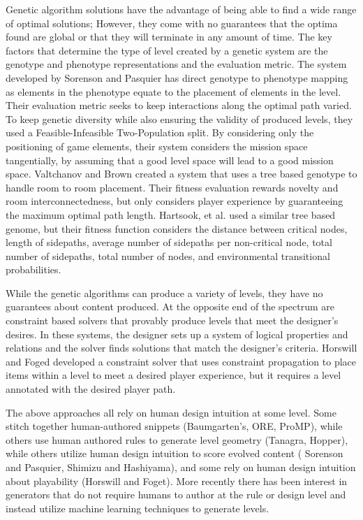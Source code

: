 \documentclass[a4paper]{article}
\begin{document}
Genetic algorithm solutions have the advantage of being able to find a wide range of optimal solutions; However, they come with no guarantees that the optima found are global or that they will terminate in any amount of time.  The key factors that determine the type of level created by a genetic system are the genotype and phenotype representations and the evaluation metric. The system developed by Sorenson and Pasquier \cite{SORPASLEVEL} has direct genotype to phenotype mapping as elements in the phenotype equate to the placement of elements in the level. Their evaluation metric seeks to keep interactions along the optimal path varied.  To keep genetic diversity while also ensuring the validity of produced levels, they used a Feasible-Infeasible Two-Population split.  By considering only the positioning of game elements, their system considers the mission space tangentially, by assuming that a good level space will lead to a good mission space. Valtchanov and Brown \cite{VALTCHANOVEVOLVE} 
created a system that uses a tree based genotype to handle room to room placement.  Their fitness evaluation rewards novelty and room interconnectedness, but only considers player experience by guaranteeing the maximum optimal path length.  Hartsook, et al. \cite{hartsook} used a similar tree based genome, but their fitness function considers the distance between critical nodes, 
length of sidepaths, average number of sidepaths per non-critical node, total 
number of sidepaths, total number of nodes, and environmental transitional probabilities.  

While the genetic algorithms can produce a variety of levels, they have no guarantees about content produced. At the opposite end of the spectrum are constraint based solvers that provably produce levels that meet the designer's desires. In these systems, the designer sets up a system of logical properties and relations and the solver finds solutions that match the designer's criteria.
Horswill and Foged \cite{HORSWILLCONSTRAINT} developed a constraint solver that uses constraint propagation to place items within a level to meet a desired player experience, but it requires a level annotated with the desired player path. 

The above approaches all rely on human design intuition at some level.  Some stitch together human-authored snippets (Baumgarten's, ORE, ProMP), while others use human authored rules to generate level geometry (Tanagra, Hopper), while others  utilize human design intuition to score evolved content ( Sorenson and Pasquier, Shimizu and Hashiyama), and some rely on human design intuition about playability (Horswill and Foget).  More recently there has been interest in generators that do not require humans to author at the rule or design level and instead utilize machine learning techniques to generate levels.
\end{document}
